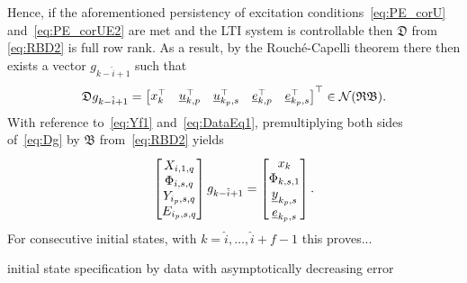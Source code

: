 Hence, if the aforementioned persistency of excitation conditions~\eqref{eq:PE_corU} and~\eqref{eq:PE_corUE2} are met and the \ac{LTI} system is controllable then $\mathfrak{D}$ from \eqref{eq:RBD2} is full row rank. As a result, by the Rouch\'{e}-Capelli theorem there then exists a vector $g_{k-\hat{i}+1}$ such that
\begin{align}\label{eq:Dg}
    \mathfrak{D} g_{k-\hat{i}+1} =
    \begin{bmatrix}
        x_k^\top & \underline{u}_{k,p}^\top & \underline{u}_{k_p,s}^\top & \underline{e}_{k,p}^\top & \underline{e}_{k_p,s}^\top
    \end{bmatrix}^\top\in\mathcal{N}(\mathfrak{RB}).
\end{align}
With reference to~\eqref{eq:Yf1} and~\eqref{eq:DataEq1}, premultiplying both sides of~\eqref{eq:Dg} by $\mathfrak{B}$ from~\eqref{eq:RBD2} yields
\begin{align}
    \begin{bmatrix}
        X_{i,1,q}\\
        \Phi_{i,s,q}\\
        Y_{i_p,s,q}\\
        E_{i_p,s,q}
    \end{bmatrix}g_{k-\hat{i}+1}=
    \begin{bmatrix}
        x_k\\
        \Phi_{k,s,1}\\
        \underline{y}_{k_p,s}\\
        \underline{e}_{k_p,s}
    \end{bmatrix}.
\end{align}
For consecutive initial states, with $k={\hat{i},\dots,\hat{i}+f-1}$ this proves...

initial state specification by data with asymptotically decreasing error



